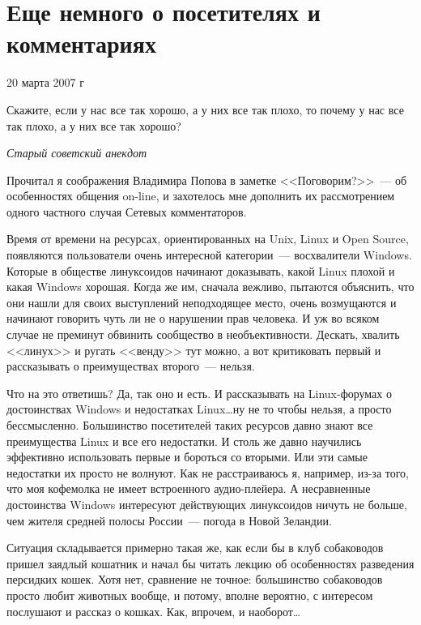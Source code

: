 \section{Еще немного о посетителях и комментариях} 
\begin{timeline}20 марта 2007 г\end{timeline}

\hfill \begin{minipage}[h]{0.45\textwidth}
Скажите, если у нас все так хорошо, а у них все так плохо, то почему у нас все так плохо, а у них все так хорошо?
\begin{flushright}
\textit{Старый советский анекдот}
\end{flushright}
\bigskip\end{minipage}

Прочитал я соображения Владимира Попова в заметке <<Поговорим?>>~--- об особенностях общения on-line, и захотелось мне дополнить их рассмотрением одного частного случая Сетевых комментаторов. 

Время от времени на ресурсах, ориентированных на Unix, Linux и Open Source, появляются пользователи очень интересной категории~--- восхвалители Windows. Которые в обществе линуксоидов начинают доказывать, какой Linux плохой и какая Windows хорошая. Когда же им, сначала вежливо, пытаются объяснить, что они нашли для своих выступлений неподходящее место, очень возмущаются и начинают говорить чуть ли не о нарушении прав человека. И уж во всяком случае не преминут обвинить сообщество в необъективности. Дескать, хвалить <<линух>> и ругать <<венду>> тут можно, а вот критиковать первый и рассказывать о преимуществах второго~--- нельзя.

Что на это ответишь? Да, так оно и есть. И рассказывать на Linux-форумах о достоинствах Windows и недостатках Linux\dots ну не то чтобы нельзя, а просто бессмысленно. Большинство посетителей таких ресурсов давно знают все преимущества Linux и все его недостатки. И столь же давно научились эффективно использовать первые и бороться со вторыми. Или эти самые недостатки их просто не волнуют. Как не расстраиваюсь я, например, из-за того, что моя кофемолка не имеет встроенного аудио-плейера. А несравненные достоинства Windows интересуют действующих линуксоидов ничуть не больше, чем жителя средней полосы России~--- погода в Новой Зеландии.

Ситуация складывается примерно такая же, как если бы в клуб собаководов пришел заядлый кошатник и начал бы читать лекцию об особенностях разведения персидких кошек. Хотя нет, сравнение не точное: большинство собаководов просто любит животных вообще, и потому, вполне вероятно, с интересом послушают и рассказ о кошках. Как, впрочем, и наоборот\dots

